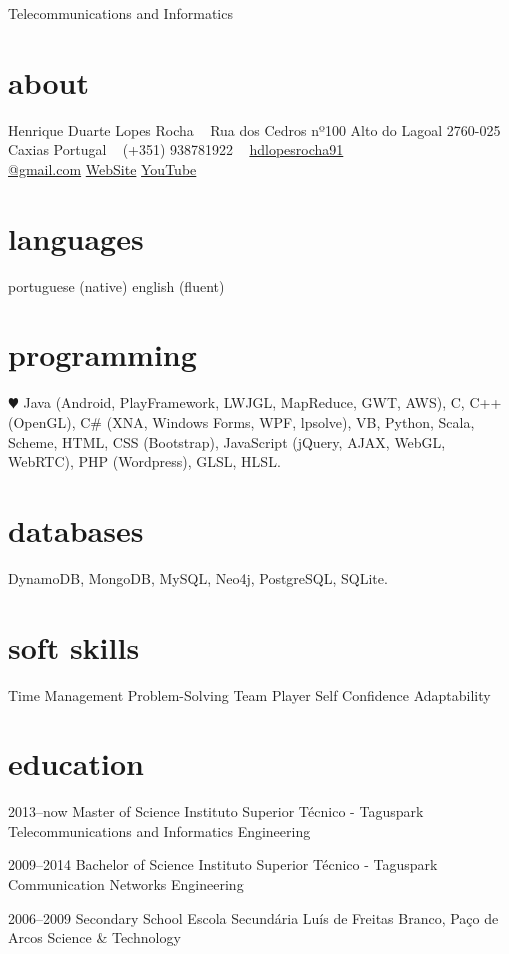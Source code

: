 \documentclass[]{friggeri-cv}
\begin{document}
       {Telecommunications and Informatics}


\begin{aside}
  \section{about}
    Henrique Duarte Lopes Rocha
    ~
    Rua dos Cedros nº100
    Alto do Lagoal
    2760-025 Caxias
    Portugal
    ~
    (+351) 938781922
    ~
    \href{mailto:hdlopesrocha91@gmail.com}{hdlopesrocha91\\@gmail.com}
    \href{http://web.ist.utl.pt/ist168621}{WebSite}
    \href{http://www.youtube.com/user/hdlopesrocha}{YouTube}
  \section{languages}
    portuguese (native)
    english (fluent)
  \section{programming}
    {\color{red} $\varheartsuit$} Java
	 (Android, PlayFramework, LWJGL, MapReduce, GWT, AWS), C, C++ (OpenGL), C\# (XNA, Windows Forms, WPF, lpsolve), VB, Python, Scala, Scheme, HTML, CSS (Bootstrap), JavaScript (jQuery, AJAX, WebGL, WebRTC), PHP (Wordpress), GLSL, HLSL.  
   \section{databases}
	DynamoDB, MongoDB, MySQL, Neo4j, PostgreSQL, SQLite.
   \section{soft skills}
	Time Management
	Problem-Solving
	Team Player
	Self Confidence
	Adaptability
\end{aside}

\section{education}

\begin{entrylist}
   \entry
    {2013–now}
    {Master of Science}
    {Instituto Superior Técnico - Taguspark}
    {Telecommunications and Informatics Engineering}
  
   \entry
    {2009–2014}
    {Bachelor of Science}
    {Instituto Superior Técnico - Taguspark}
    {Communication Networks Engineering}

  \entry
    {2006–2009}
    {Secondary School}
    {Escola Secundária Luís de Freitas Branco, Paço de Arcos}
    {Science \& Technology}

\end{entrylist}
\end{document}
